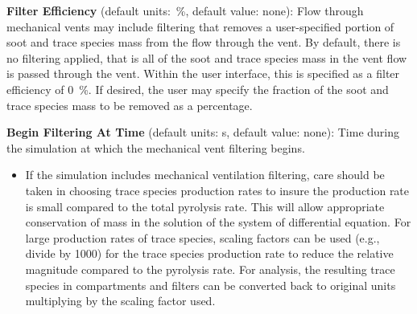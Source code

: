 \textbf{Filter Efficiency} (default units:~\%, default value: none): Flow through mechanical vents may include filtering that removes a user-specified portion of soot and trace species mass from the flow through the vent.  By default, there is no filtering applied, that is all of the soot and trace species mass in the vent flow is passed through the vent. Within the user interface, this is specified as a filter efficiency of 0~\%.  If desired, the user may specify the fraction of the soot and trace species mass to be removed as a percentage.

\textbf{Begin Filtering At Time} (default units: s, default value: none): Time during the simulation at which the mechanical vent filtering begins.

\begin{itemize}
\item If the simulation includes mechanical ventilation filtering, care should be taken in choosing trace species production rates to insure the production rate is small compared to the total pyrolysis rate.  This will allow appropriate conservation of mass in the solution of the system of differential equation.  For large production rates of trace species, scaling factors can be used (e.g., divide by 1000) for the trace species production rate to reduce the relative magnitude compared to the pyrolysis rate.  For analysis, the resulting trace species in compartments and filters can be converted back to original units multiplying by the scaling factor used.
\end{itemize} 